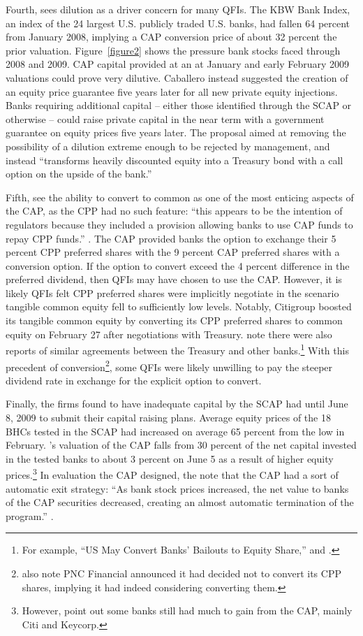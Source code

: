 \documentclass[12pt]{article}
\begin{document}
Fourth, \citet{Caballero} sees dilution as a driver concern for many QFIs. The KBW Bank Index, an index of the 24 largest U.S. publicly traded U.S. banks, had fallen 64 percent from January 2008, implying a CAP conversion price of about 32 percent the prior valuation. Figure~\ref{figure2} shows the pressure bank stocks faced through 2008 and 2009. CAP capital provided at an at January and early February 2009 valuations could prove very dilutive. Caballero instead suggested the creation of an equity price guarantee five years later for all new private equity injections. Banks requiring additional capital -- either those identified through the SCAP or otherwise -- could raise private capital in the near term with a government guarantee on equity prices five years later. The proposal aimed at removing the possibility of a dilution extreme enough to be rejected by management, and instead “transforms heavily discounted equity into a Treasury bond with a call option on the upside of the bank.''

Fifth, \citet{GW} see the ability to convert to common as one of the most enticing aspects of the CAP, as the CPP had no such feature: “this appears to be the intention of regulators because they included a provision allowing banks to use CAP funds to repay CPP funds.'' \citep{GW}. The CAP provided banks the option to exchange their 5 percent CPP preferred shares with the 9 percent CAP preferred shares with a conversion option. If the option to convert exceed the 4 percent difference in the preferred dividend, then QFIs may have chosen to use the CAP. However, it is likely QFIs felt CPP preferred shares were implicitly negotiate in the scenario tangible common equity fell to sufficiently low levels. Notably, Citigroup boosted its tangible common equity by converting its CPP preferred shares to common equity on February 27 after negotiations with Treasury. \citet{GW} note there were also reports of similar agreements between the Treasury and other banks.\footnote{For example, ``US May Convert Banks' Bailouts to Equity Share,'' \citep{Andrews} and \citep{GW}.} With this precedent of conversion\footnote{\citet{GW} also note PNC Financial announced it had decided not to convert its CPP shares, implying it had indeed considering converting them.}, some QFIs were likely unwilling to pay the steeper dividend rate in exchange for the explicit option to convert.

Finally, the firms found to have inadequate capital by the SCAP had until June 8, 2009 to submit their capital raising plans. Average equity prices of the 18 BHCs tested in the SCAP had increased on average 65 percent from the low in February. \citet{GW}'s valuation of the CAP falls from 30 percent of the net capital invested in the tested banks to about 3 percent on June 5 as a result of higher equity prices.\footnote{However, \citet{GW} point out some banks still had much to gain from the CAP, mainly Citi and Keycorp.} In evaluation the CAP designed, the note that the CAP had a sort of automatic exit strategy: “As bank stock prices increased, the net value to banks of the CAP securities decreased, creating an almost automatic termination of the program.'' \citep{GW}.
\end{document}
